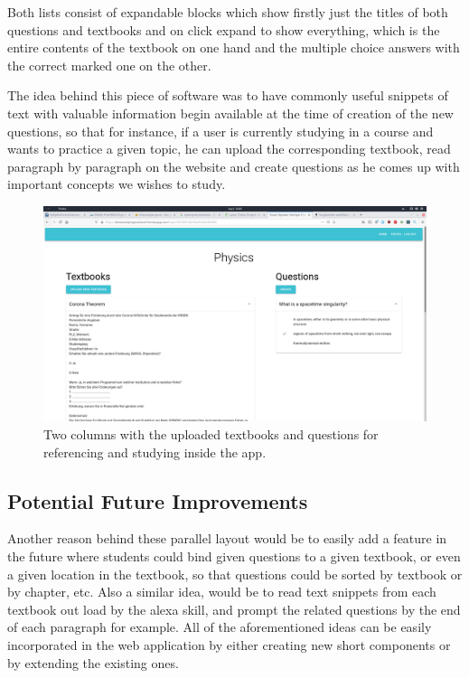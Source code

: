 Both lists consist of expandable blocks which show firstly just the titles of both
questions and textbooks and on click expand to show everything, which is the entire
contents of the textbook on one hand and the multiple choice answers with the 
correct marked one on the other.

The idea behind this piece of software was to have commonly useful snippets of text
with valuable information begin available at the time of creation of the new questions,
so that for instance, if a user is currently studying in a course and wants to 
practice a given topic, he can upload the corresponding textbook, read paragraph by 
paragraph on the website and create questions as he comes up with important concepts
we wishes to study.

\begin{figure}
  \centering
  \includegraphics[width=.9\linewidth]{images/app/asa/topic.png}
  \caption{Two columns with the uploaded textbooks and questions for referencing and studying 
    inside the app.
  }
  \label{fig:topic}
\end{figure}
 
 
\subsection{Potential Future Improvements}
\label{subsection:future}
Another reason behind these parallel layout would be to easily add a feature in the future
where students could bind given questions to a given textbook, or even a given location
in the textbook, so that questions could be sorted by textbook or by chapter, etc.
Also a similar idea, would be to read text snippets from each textbook out load 
by the alexa skill, and prompt the related questions by the end of each paragraph for
example. All of the aforementioned ideas can be easily incorporated in the web application
by either creating new short components or by extending the existing ones.


